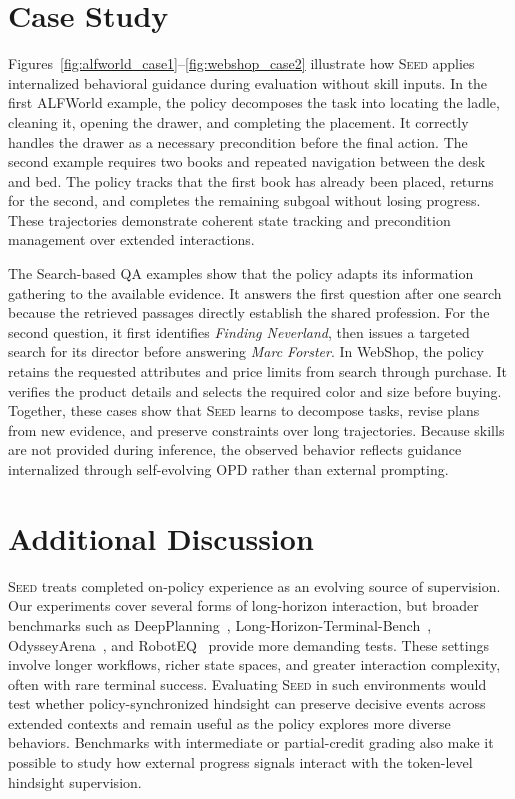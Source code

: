 \section{Case Study}\label{app:case_study}
Figures~\ref{fig:alfworld_case1}--\ref{fig:webshop_case2} illustrate how \textsc{Seed} applies internalized behavioral guidance during evaluation without skill inputs. In the first ALFWorld example, the policy decomposes the task into locating the ladle, cleaning it, opening the drawer, and completing the placement. It correctly handles the drawer as a necessary precondition before the final action. The second example requires two books and repeated navigation between the desk and bed. The policy tracks that the first book has already been placed, returns for the second, and completes the remaining subgoal without losing progress. These trajectories demonstrate coherent state tracking and precondition management over extended interactions.

The Search-based QA examples show that the policy adapts its information gathering to the available evidence. It answers the first question after one search because the retrieved passages directly establish the shared profession. For the second question, it first identifies \textit{Finding Neverland}, then issues a targeted search for its director before answering \textit{Marc Forster}. In WebShop, the policy retains the requested attributes and price limits from search through purchase. It verifies the product details and selects the required color and size before buying. Together, these cases show that \textsc{Seed} learns to decompose tasks, revise plans from new evidence, and preserve constraints over long trajectories. Because skills are not provided during inference, the observed behavior reflects guidance internalized through self-evolving OPD rather than external prompting.

\section{Additional Discussion}\label{app:discussion}
\textsc{Seed} treats completed on-policy experience as an evolving source of supervision. Our experiments cover several forms of long-horizon interaction, but broader benchmarks such as DeepPlanning~\citep{zhang2026deepplanning}, Long-Horizon-Terminal-Bench~\citep{li2026longhorizonterminal}, OdysseyArena~\citep{xu2026odysseyarena}, and RobotEQ~\citep{fang2026roboteq} provide more demanding tests. These settings involve longer workflows, richer state spaces, and greater interaction complexity, often with rare terminal success. Evaluating \textsc{Seed} in such environments would test whether policy-synchronized hindsight can preserve decisive events across extended contexts and remain useful as the policy explores more diverse behaviors. Benchmarks with intermediate or partial-credit grading also make it possible to study how external progress signals interact with the token-level hindsight supervision.

